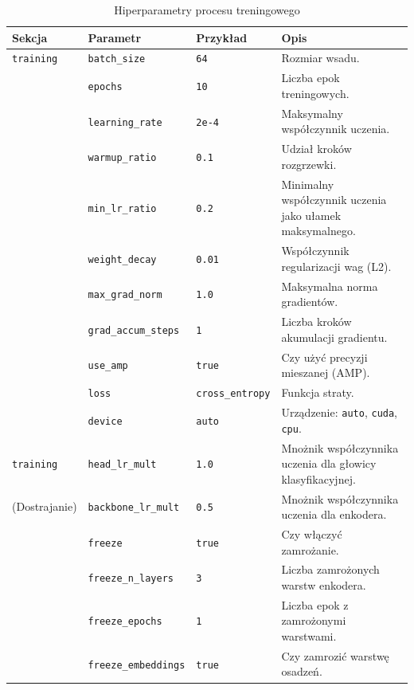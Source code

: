 \documentclass[a4paper,11pt,twoside]{report}
\theoremstyle{definition}
\begin{document}
\begin{table}[h!]
\centering
\caption{Hiperparametry procesu treningowego}
\label{tab:params_training}
\small
\smallskip
\begin{tabularx}{\textwidth}{@{}lllX@{}}
\toprule
\textbf{Sekcja} & \textbf{Parametr} & \textbf{Przykład} & \textbf{Opis} \\
\midrule
\texttt{training} 
    & \texttt{batch\_size} & \texttt{64} & Rozmiar wsadu. \\
    & \texttt{epochs} & \texttt{10} & Liczba epok treningowych. \\
    & \texttt{learning\_rate} & \texttt{2e-4} & Maksymalny współczynnik uczenia. \\
    & \texttt{warmup\_ratio} & \texttt{0.1} & Udział kroków rozgrzewki. \\
    & \texttt{min\_lr\_ratio} & \texttt{0.2} & Minimalny współczynnik uczenia jako ułamek maksymalnego. \\
    & \texttt{weight\_decay} & \texttt{0.01} & Współczynnik regularizacji wag (L2). \\
    & \texttt{max\_grad\_norm} & \texttt{1.0} & Maksymalna norma gradientów. \\
    & \texttt{grad\_accum\_steps} & \texttt{1} & Liczba kroków akumulacji gradientu. \\
    & \texttt{use\_amp} & \texttt{true} & Czy użyć precyzji mieszanej (AMP). \\
    & \texttt{loss} & \texttt{cross\_entropy} & Funkcja straty. \\
    & \texttt{device} & \texttt{auto} & Urządzenie: \texttt{auto}, \texttt{cuda}, \texttt{cpu}. \\
\midrule
\texttt{training}
    & \texttt{head\_lr\_mult} & \texttt{1.0} & Mnożnik współczynnika uczenia dla głowicy klasyfikacyjnej. \\
(Dostrajanie)
    & \texttt{backbone\_lr\_mult} & \texttt{0.5} & Mnożnik współczynnika uczenia dla enkodera. \\
    & \texttt{freeze} & \texttt{true} & Czy włączyć zamrożanie. \\
    & \texttt{freeze\_n\_layers} & \texttt{3} & Liczba zamrożonych warstw enkodera. \\
    & \texttt{freeze\_epochs} & \texttt{1} & Liczba epok z zamrożonymi warstwami. \\
    & \texttt{freeze\_embeddings} & \texttt{true} & Czy zamrozić warstwę osadzeń. \\
\bottomrule
\end{tabularx}
\end{table}
\end{document}
